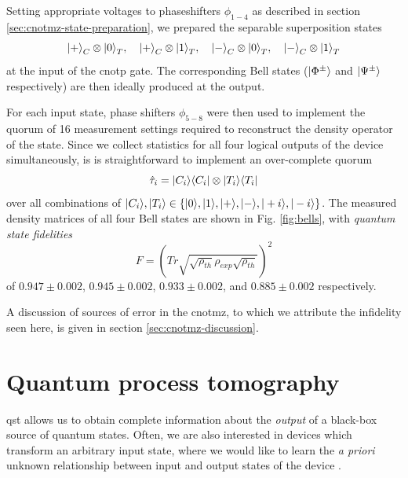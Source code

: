Setting appropriate voltages to phaseshifters $\phi_{1-4}$ as described in section \ref{sec:cnotmz-state-preparation}, we prepared the separable superposition states
\begin{equation}
   \mbox{$ | + \rangle $}_C\otimes\mbox{$ | 0 \rangle $}_T,\quad\mbox{$ | + \rangle $}_C\otimes\mbox{$ | 1 \rangle $}_T,\quad\mbox{$ | - \rangle $}_C\otimes\mbox{$ | 0 \rangle $}_T,\quad\mbox{$ | - \rangle $}_C\otimes\mbox{$ | 1 \rangle $}_T
\end{equation}
at the input of the \gls{cnotp} gate.  The corresponding Bell states ($\mbox{$ | \Phi^{\pm} \rangle $}$ and  $\mbox{$ | \Psi^{\pm} \rangle $}$ respectively) are then ideally produced at the output.

For each input state, phase shifters $\phi_{5-8}$ were then used to implement the quorum of 16 measurement settings required to reconstruct the density operator of the state. Since we collect statistics for all four logical outputs of the device simultaneously, is is straightforward to implement an over-complete quorum 
\begin{equation}
    \hat{\tau}_i = \mbox{$ | C_i \rangle $}\mbox{$ \langle C_i | $} \otimes \mbox{$ | T_i \rangle $}\mbox{$ \langle T_i | $}
\end{equation}
over all combinations of $\mbox{$ | C_i \rangle $}, \mbox{$ | T_i \rangle $} \in \{\mbox{$ | 0 \rangle $}, \mbox{$ | 1 \rangle $}, \mbox{$ | + \rangle $}, \mbox{$ | - \rangle $}, \mbox{$ | +i \rangle $}, \mbox{$ | -i \rangle $}\}$.  
The measured density matrices of all four Bell states are shown in Fig. \ref{fig:bells}, with \emph{quantum state fidelities} \cite{Nielsen2004}
\begin{equation}
F=\left (Tr \sqrt{\sqrt{\rho_{th}} \rho_{exp} \sqrt{\rho_{th}} } \right)^{2} 
\label{eqn:quantum-state-fidelity}
\end{equation}
of  $0.947\pm0.002$, $0.945\pm0.002$, $0.933\pm0.002$, and $0.885\pm0.002$ respectively. 

A discussion of sources of error in the \gls{cnotmz}, to which we attribute the infidelity seen here, is given in section \ref{sec:cnotmz-discussion}.

\section{Quantum process tomography}
\label{sec:cnot-process-tomography}
\newcommand{\process}{\mathcal{E}}

\gls{qst} allows us to obtain complete information about the \emph{output} of a black-box source of quantum states. Often, we are also interested in devices which transform an arbitrary input state, where we would like to learn the \emph{a priori} unknown relationship between input and output states of the device \cite{White2007}.

